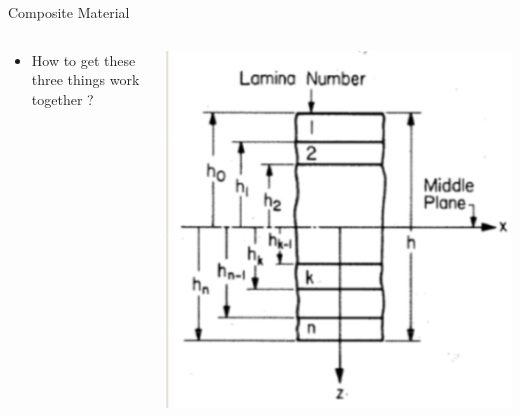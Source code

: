 \documentclass{beamer}
\begin{document}
\begin{frame}{Composite Material}
    \begin{columns}[c]
    \begin{column}{0.5\textwidth}
        \begin{itemize}
            \item  How to get these three things work together ?
        \end{itemize}
    \end{column}
    \begin{column}{0.5\textwidth}
        \begin{center}
              \includegraphics[width=0.8\linewidth]{GA_images/composite-material.png}
        \end{center}
    \end{column}
\end{columns}
\end{frame}
\end{document}
